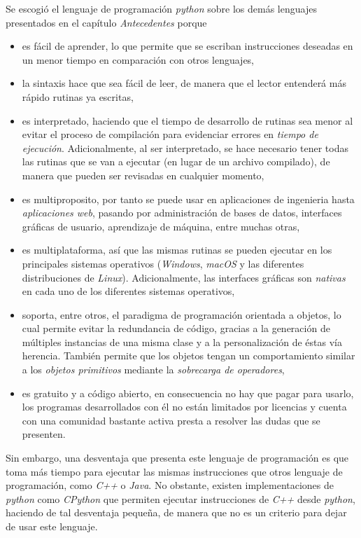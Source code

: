 Se escogió el lenguaje de programación \textit{python} sobre los demás lenguajes presentados en el capítulo \textit{Antecedentes} porque
\begin{itemize}
    \item es fácil de aprender, lo que permite que se escriban instrucciones deseadas en un menor tiempo en comparación con otros lenguajes,
    \item la sintaxis hace que sea fácil de leer, de manera que el lector entenderá más rápido rutinas ya escritas,
    \item es interpretado, haciendo que el tiempo de desarrollo de rutinas sea menor al evitar el proceso de compilación para evidenciar errores en \textit{tiempo de ejecución}. Adicionalmente, al ser interpretado, se hace necesario tener todas las rutinas que se van a ejecutar (en lugar de un archivo compilado), de manera que pueden ser revisadas en cualquier momento,
    \item es multiproposito, por tanto se puede usar en aplicaciones de ingenieria hasta \textit{aplicaciones web}, pasando por administración de bases de datos, interfaces gráficas de usuario, aprendizaje de máquina, entre muchas otras,
    \item es multiplataforma, así que las mismas rutinas se pueden ejecutar en los principales sistemas operativos (\textit{Windows}, \textit{macOS} y las diferentes distribuciones de \textit{Linux}). Adicionalmente, las interfaces gráficas son \textit{nativas} en cada uno de los diferentes sistemas operativos,
    \item soporta, entre otros, el paradigma de programación orientada a objetos, lo cual permite evitar la redundancia de código, gracias a la generación de múltiples instancias de una misma clase y a la personalización de éstas vía herencia. También permite que los objetos tengan un comportamiento similar a los \textit{objetos primitivos} mediante la \textit{sobrecarga de operadores},
    \item es gratuito y a código abierto, en consecuencia no hay que pagar para usarlo, los programas desarrollados con él no están limitados por licencias y cuenta con una comunidad bastante activa presta a resolver las dudas que se presenten.
\end{itemize}

Sin embargo, una desventaja que presenta este lenguaje de programación es que toma más tiempo para ejecutar las mismas instrucciones que otros lenguaje de programación, como \textit{C++} o \textit{Java}. No obstante, existen implementaciones de \textit{python} como \textit{CPython} que permiten ejecutar instrucciones de \textit{C++} desde \textit{python}, haciendo de tal desventaja pequeña, de manera que no es un criterio para dejar de usar este lenguaje.

